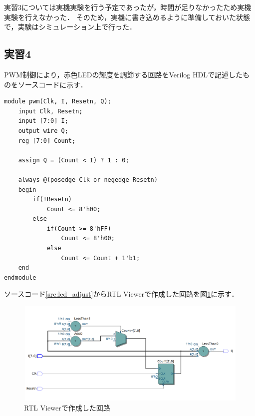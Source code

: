 \documentclass{jlreq}
\numberwithin{equation}{section}
\begin{document}
実習3については実機実験を行う予定であったが，時間が足りなかったため実機実験を行えなかった．
そのため，実機に書き込めるように準備しておいた状態で，実験はシミュレーション上で行った．

\subsection{実習4}
PWM制御により，赤色LEDの輝度を調節する回路をVerilog HDLで記述したものをソースコードに示す．
\begin{lstlisting}[caption=赤色LEDの輝度を調節するモジュール, label=src:led_adjust]
module pwm(Clk, I, Resetn, Q);
	input Clk, Resetn;
	input [7:0] I;
	output wire Q;
	reg [7:0] Count;
	
	assign Q = (Count < I) ? 1 : 0;
	
	always @(posedge Clk or negedge Resetn)
	begin
		if(!Resetn)
			Count <= 8'h00;
		else
			if(Count >= 8'hFF)
				Count <= 8'h00;
			else
				Count <= Count + 1'b1;
	end
endmodule
\end{lstlisting}

ソースコード\ref{src:led_adjust}からRTL Viewerで作成した回路を図\ref{fig:pwm_rtl_viewer}に示す．
\begin{figure}[H]
	\centering
	\includegraphics[width=\textwidth]{assets/pwm_rtl_viewer.png}
	\caption{RTL Viewerで作成した回路}
	\label{fig:pwm_rtl_viewer}
\end{figure}
\end{document}
